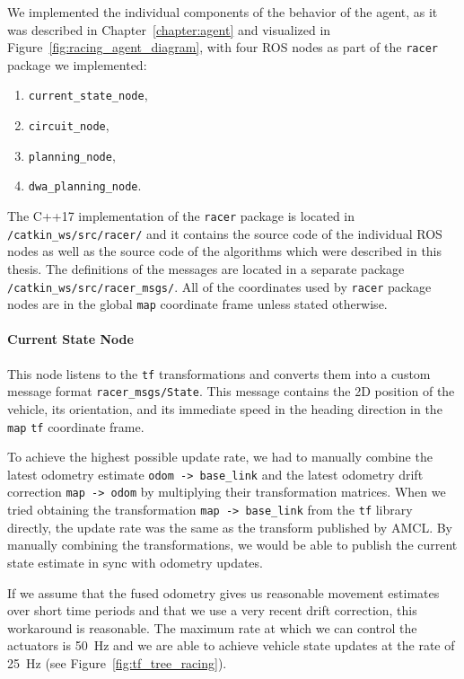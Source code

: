 We implemented the individual components of the behavior of the agent, as it was described in Chapter~\ref{chapter:agent} and visualized in Figure~\ref{fig:racing_agent_diagram}, with four \gls*{ROS} nodes as part of the \verb|racer| package we implemented:

\begin{enumerate}
	\item \verb|current_state_node|,	
	\item \verb|circuit_node|,
	\item \verb|planning_node|,	
	\item \verb|dwa_planning_node|.
\end{enumerate}

The C++17 implementation of the \verb|racer| package is located in \texttt{/catkin\_ws/\-src/racer/} and it contains the source code of the individual \gls*{ROS} nodes as well as the source code of the algorithms which were described in this thesis. The definitions of the messages are located in a separate package \texttt{/catkin\_ws/\allowbreak src/racer\_msgs/}. All of the coordinates used by \verb|racer| package nodes are in the global \verb|map| coordinate frame unless stated otherwise.

\paragraph{Current State Node}

This node listens to the \verb|tf| transformations and converts them into a custom message format \verb|racer_msgs/State|. This message contains the 2D position of the vehicle, its orientation, and its immediate speed in the heading direction in the \verb|map| \verb|tf| coordinate frame.

To achieve the highest possible update rate, we had to manually combine the latest odometry estimate \verb|odom -> base_link| and the latest odometry drift correction \verb|map -> odom| by multiplying their transformation matrices. When we tried obtaining the transformation \verb|map -> base_link| from the \verb|tf| library directly, the update rate was the same as the transform published by \gls*{AMCL}. By manually combining the transformations, we would be able to publish the current state estimate in sync with odometry updates.

If we assume that the fused odometry gives us reasonable movement estimates over short time periods and that we use a very recent drift correction, this workaround is reasonable. The maximum rate at which we can control the actuators is \SI{50}{\hertz} and we are able to achieve vehicle state updates at the rate of \SI{25}{\hertz} (see Figure~\ref{fig:tf_tree_racing}).

